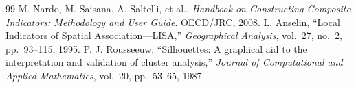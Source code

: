 \documentclass[11pt]{article}
\begin{document}
\begin{thebibliography}{99}
 M. Nardo, M. Saisana, A. Saltelli, et al., \textit{Handbook on Constructing Composite Indicators: Methodology and User Guide}. OECD/JRC, 2008.
 L. Anselin, ``Local Indicators of Spatial Association---LISA,'' \textit{Geographical Analysis}, vol.~27, no.~2, pp.~93--115, 1995.
 P. J. Rousseeuw, ``Silhouettes: A graphical aid to the interpretation and validation of cluster analysis,'' \textit{Journal of Computational and Applied Mathematics}, vol.~20, pp.~53--65, 1987.

\end{thebibliography}
\end{document}
